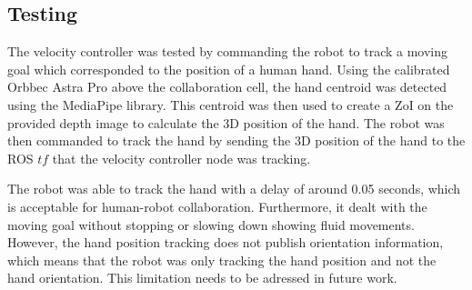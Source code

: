 \subsection{Testing}

The velocity controller was tested by commanding the robot to track a moving goal which corresponded to the position of a human hand. Using the calibrated Orbbec Astra Pro above the collaboration cell, the hand centroid was detected using the MediaPipe library. This centroid was then used to create a ZoI on the provided depth image to calculate the 3D position of the hand. The robot was then commanded to track the hand by sending the 3D position of the hand to the ROS $tf$ that the velocity controller node was tracking.

The robot was able to track the hand with a delay of around 0.05 seconds, which is acceptable for human-robot collaboration. Furthermore, it dealt with the moving goal without stopping or slowing down showing fluid movements. However, the hand position tracking does not publish orientation information, which means that the robot was only tracking the hand position and not the hand orientation. This limitation needs to be adressed in future work.
